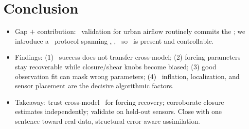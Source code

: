 \section{Conclusion}
\label{sec:conclusion}


\begin{itemize}
  \item Gap $+$ contribution: \esmda\ validation for urban airflow routinely
        commits the \invcrime; we introduce a \crossmodel\ protocol spanning
        \lbmmodel, \pyudales, \pypalm\ so \discrepancy\ is present and
        controllable.
  \item Findings: (1) \twinexp\ success does not transfer cross-model;
        (2) forcing parameters stay recoverable while closure/shear knobs
        become biased; (3) good observation fit can mask wrong parameters;
        (4) \Cd\ inflation, localization, and sensor placement are the
        decisive algorithmic factors. 
  \item Takeaway: trust cross-model \esmda\ for forcing recovery; corroborate
        closure estimates independently; validate on held-out sensors. Close
        with one sentence toward real-data, structural-error-aware assimilation.
\end{itemize}
